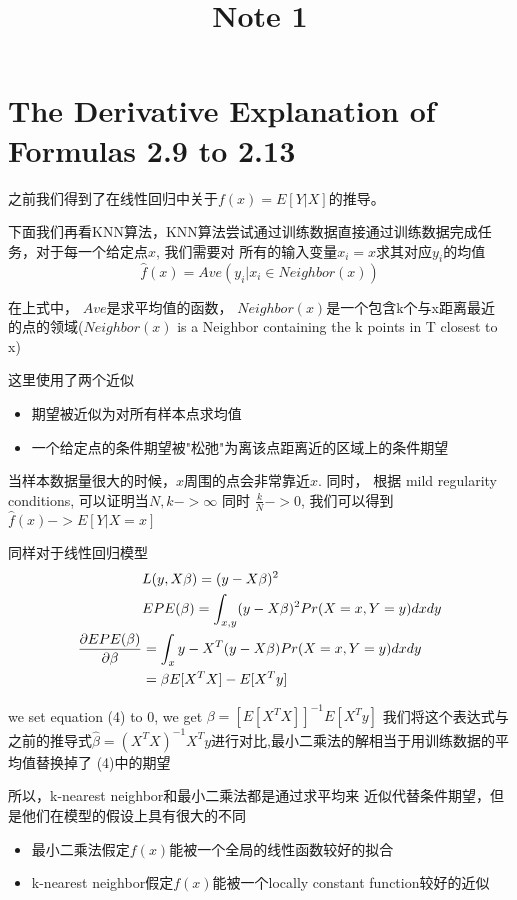 \documentclass[ruled]{article}
\begin{document}
\title{Note 1}


\section{The Derivative Explanation of Formulas 2.9 to 2.13}
之前我们得到了在线性回归中关于$f(x) = E[Y|X]$的推导。

下面我们再看KNN算法，KNN算法尝试通过训练数据直接通过训练数据完成任务，对于每一个给定点$x$, 我们需要对
所有的输入变量$x_i = x$求其对应$y_i$的均值
\begin{equation}
    \hat{f}(x) = Ave(y_i | x_i \in Neighbor(x))
\end{equation}

在上式中， $Ave$是求平均值的函数， $Neighbor(x)$是一个包含k个与x距离最近
的点的领域($Neighbor(x)$ is a Neighbor containing the k points
in T closest to x)

这里使用了两个近似
\begin{itemize}
    \item 期望被近似为对所有样本点求均值
    \item 一个给定点的条件期望被"松弛"为离该点距离近的区域上的条件期望
\end{itemize}

当样本数据量很大的时候，$x$周围的点会非常靠近$x$.
同时， 根据 mild regularity conditions, 可以证明当$N,k -> \infty$
同时 $\frac{k}{N} -> 0$, 我们可以得到$\hat{f}(x) -> E[Y|X=x]$

同样对于线性回归模型
\begin{align}
    &L(y, X \beta) = (y - X \beta) ^ 2  
    \\ &EPE(\beta) = \int_{x, y} (y - X\beta) ^ 2 
    Pr(X = x, Y = y) dx dy 
    \\ \frac{\partial{EPE(\beta)}}{\partial{\beta}} &= 
    \int_{x}{y} -X^T (y - X \beta) Pr(X = x, Y = y)
    dx dy \notag \\ 
    &=\beta E[X^TX] - E[X^T y]
\end{align}

we set equation (4) to 0, we get $\beta = [E[X^T X]]^{-1} E[X^T y]$
我们将这个表达式与之前的推导式$\hat{\beta} = (X^T X) ^ {-1} 
X^T y$进行对比,最小二乘法的解相当于用训练数据的平均值替换掉了
(4)中的期望

    所以，k-nearest neighbor和最小二乘法都是通过求平均来
近似代替条件期望，但是他们在模型的假设上具有很大的不同
\begin{itemize}
  \item 最小二乘法假定$f(x)$能被一个全局的线性函数较好的拟合
  \item k-nearest neighbor假定$f(x)$能被一个locally 
  constant function较好的近似
\end{itemize}
\end{document}
